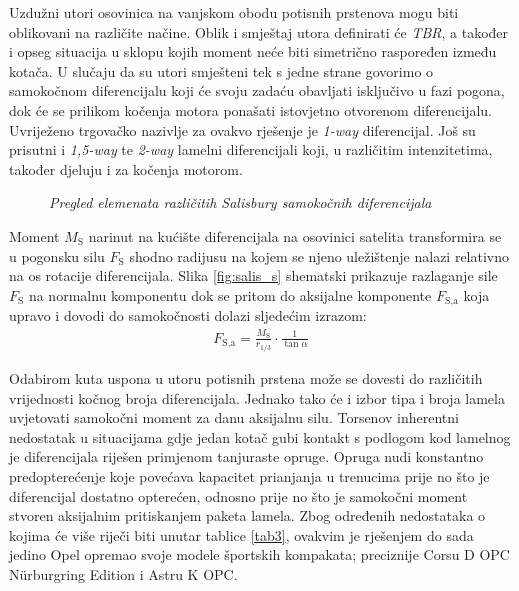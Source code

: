 \documentclass[11pt]{article}
\numberwithin{equation}{section}%
\begin{document}
Uzdužni utori osovinica na vanjskom obodu potisnih prstenova mogu biti oblikovani na različite načine. Oblik i smještaj utora definirati će \textit{TBR}, a također i opseg situacija u sklopu kojih moment neće biti simetrično raspoređen između kotača. U slučaju da su utori smješteni tek s jedne strane govorimo o samokočnom diferencijalu koji će svoju zadaću obavljati isključivo u fazi pogona, dok će se prilikom kočenja motora ponašati istovjetno otvorenom diferencijalu. Uvriježeno trgovačko nazivlje za ovakvo rješenje je \textit{1-way} diferencijal. Još su prisutni i \textit{1,5-way} te \textit{2-way} lamelni diferencijali koji, u različitim intenzitetima, također djeluju i za kočenja motorom.

\begin{figure}
 \centering
 \def\svgwidth{11cm}
 
 \caption{\textit{Pregled elemenata različitih Salisbury samokočnih diferencijala} \cite{2023basiclars}}
 \label{fig:salis}
\end{figure}

Moment $M_\text{S}$ narinut na kućište diferencijala na osovinici satelita transformira se u pogonsku silu $F_\text{S}$ shodno radijusu na kojem se njeno uležištenje nalazi relativno na os rotacije diferencijala. Slika \ref{fig:salis_s} shematski prikazuje razlaganje sile $F_\text{S}$ na normalnu komponentu dok se pritom do aksijalne komponente $F_\text{S,a}$ koja upravo i dovodi do samokočnosti dolazi sljedećim izrazom:
%
\begin{gather}
F_\text{S,a}=\frac{M_\text{S}}{r_{1/3}}\cdot \frac{1}{\tan{\alpha}}
\end{gather}

Odabirom kuta uspona u utoru potisnih prstena može se dovesti do različitih vrijednosti kočnog broja diferencijala. Jednako tako će i izbor tipa i broja lamela uvjetovati samokočni moment za danu aksijalnu silu. Torsenov inherentni nedostatak u situacijama gdje jedan kotač gubi kontakt s podlogom kod lamelnog je diferencijala riješen primjenom tanjuraste opruge. Opruga nudi konstantno predopterećenje koje povećava kapacitet prianjanja u trenucima prije no što je diferencijal dostatno opterećen, odnosno prije no što je samokočni moment stvoren aksijalnim pritiskanjem paketa lamela. Zbog određenih nedostataka o kojima će više riječi biti unutar tablice \ref{tab3}, ovakvim je rješenjem do sada jedino Opel opremao svoje modele športskih kompakata; preciznije Corsu D OPC Nürburgring Edition i Astru K OPC.
\end{document}
